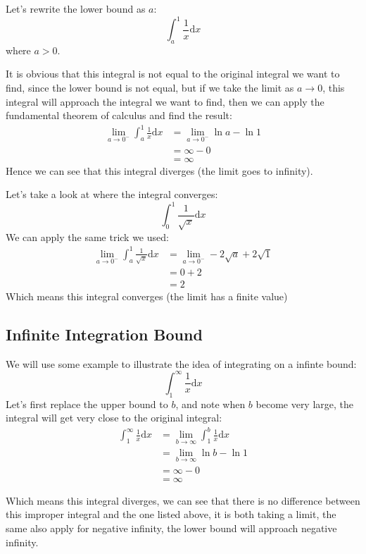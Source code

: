 \documentclass{article}
\begin{document}
Let's rewrite the lower bound as $a$:
\[
    \int_a^1\frac{1}{x}\mathrm{d}x
\]
where $a>0$.

\newpage
It is obvious that this integral is not equal to the original integral we want to find, since the lower bound is not equal,
but if we take the limit as $a\to 0$, this integral will approach the integral we want to find, then we can apply the fundamental theorem of calculus and find the result:
\[
    \begin{split}
        \lim_{a\to 0^-} \int_{a}^{1}\frac{1}{x}\mathrm{d}x &= \lim_{a\to 0^-}\ln a - \ln 1 \\
        & = \infty - 0 \\
        & = \infty
    \end{split}
\]
Hence we can see that this integral diverges (the limit goes to infinity).

Let's take a look at where the integral converges:
\[
    \int_0^1\frac{1}{\sqrt{x}}\mathrm{d}x
\]
We can apply the same trick we used:
\[
    \begin{split}
        \lim_{a\to 0^-} \int_{a}^{1}\frac{1}{\sqrt{x}}\mathrm{d}x &= \lim_{a\to 0^-} -2\sqrt{a} + 2\sqrt{1} \\
        & = 0 + 2 \\
        & = 2
    \end{split}
\]
Which means this integral converges (the limit has a finite value)

\subsection{Infinite Integration Bound}
We will use some example to illustrate the idea of integrating on a infinte bound:
\[
    \int_{1}^{\infty} \frac{1}{x}\mathrm{d}x
\]
Let's first replace the upper bound to $b$, and note when $b$ become very large, the integral will get very close to the original integral:
\[
    \begin{split}
        \int_{1}^{\infty} \frac{1}{x}\mathrm{d}x & = \lim_{b\to \infty} \int_{1}^{b} \frac{1}{x}\mathrm{d}x\\
        & = \lim_{b\to \infty} \ln b - \ln 1 \\
        & = \infty - 0\\
        & = \infty
    \end{split}
\]

Which means this integral diverges, we can see that there is no difference between this improper integral and the one listed above, it is both taking a limit, the same also apply for negative infinity,
the lower bound will approach negative infinity.
\end{document}
